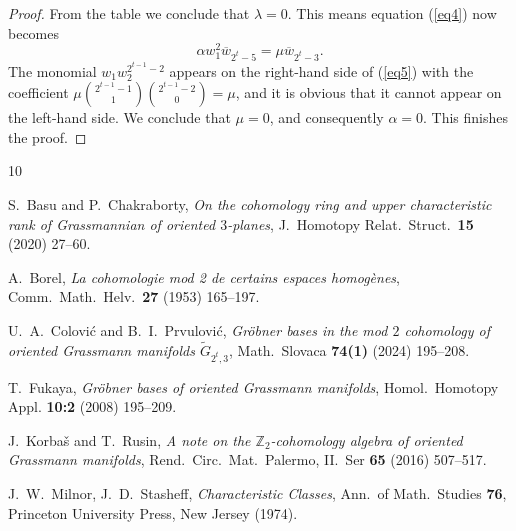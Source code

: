 \documentclass{amsart}
\theoremstyle{definition}
\theoremstyle{remark}
\numberwithin{equation}{section}
\begin{document}
\begin{proof}
From the table we conclude that $\lambda = 0$. This means equation (\ref{eq4}) now becomes
\begin{equation}\label{eq5}
    \alpha w_1^2 \overline w_{2^t-5} = \mu \overline w_{2^t-3}.
\end{equation}
The monomial $w_1w_2^{2^{t-1}-2}$ appears on the right-hand side of (\ref{eq5}) with the coefficient $\mu\binom{2^{t-1}-1}{1}\binom{2^{t-1}-2}{0} = \mu$, and it is obvious that it cannot appear on the left-hand side. We conclude that $\mu=0$, and consequently $\alpha=0$. This finishes the proof.
\end{proof}






\begin{thebibliography}{10}


%
{S.\ Basu and P.\ Chakraborty}, {\it On the cohomology ring and upper characteristic rank of Grassmannian
of oriented $3$-planes}, J.\ Homotopy Relat.\ Struct.\ {\bf 15} (2020) 27--60.


%
{ A.\ Borel}, {\it La cohomologie mod 2 de certains espaces homog\`enes}, Comm.\ Math.\ Helv.\ {\bf 27} (1953) 165--197.

%
{U.\ A.\ Colovi\'c and B.\ I.\ Prvulovi\'c,} {\it Gr\"obner bases in the mod $2$ cohomology of oriented Grassmann manifolds $\widetilde G_{2^t,3}$}, Math.\ Slovaca {\bf 74(1)} (2024) 195--208.


%
{ T.\ Fukaya}, {\it Gr\"obner bases of oriented Grassmann manifolds}, {Homol.\ Homotopy Appl.} {\bf 10:2} (2008) 195--209.

%
{J.\ Korba\v s and T.\ Rusin,} {\it A note on the $\mathbb Z_2$-cohomology algebra of oriented Grassmann manifolds}, {Rend.\ Circ.\ Mat.\ Palermo, II.\ Ser} {\bf 65} (2016) 507--517.

%
J.\ W.\ Milnor, J.\ D.\ Stasheff, \textit{Characteristic Classes}, Ann.\ of Math.\ Studies \textbf{76}, Princeton University Press, New Jersey (1974).



\end{thebibliography}
\end{document}
